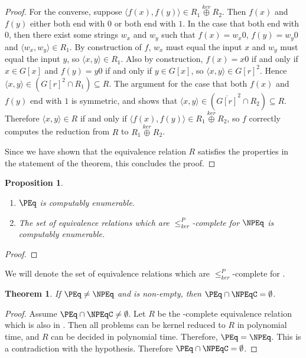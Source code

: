 \documentclass{article}
\newtheorem{theorem}{Theorem}[section]
\newtheorem{proposition}[proposition]{Proposition}
\theoremstyle{definition} \newtheorem{definition}[definition]{Definition}
\newcommand{\kj}{\overset{ker}{\oplus}} %
\newcommand{\kr}{\leq^{P}_{ker}} %
\newcommand{\pair}[2]{\langle#1,#2\rangle} %
\begin{document}
\begin{proof}
  For the converse, suppose $\pair{f(x)}{f(y)}\in R_1\kj R_2$. Then $f(x)$ and
  $f(y)$ either both end with $0$ or both end with $1$. In the case that both
  end with $0$, then there exist some strings $w_x$ and $w_y$ such that
  $f(x)=w_x0$, $f(y)=w_y0$ and $\pair{w_x}{w_y}\in R_1$. By construction of
  $f$, $w_x$ must equal the input $x$ and $w_y$ must equal the input $y$, so
  $\pair{x}{y}\in R_1$. Also by construction, $f(x)=x0$ if and only if $x\in
  G[x]$ and $f(y)=y0$ if and only if $y\in G[x]$, so
  $\pair{x}{y}\in{G[r]}^2$. Hence $\pair{x}{y}\in({G[r]}^2\cap R_1)\subseteq
  R$. The argument for the case that both $f(x)$ and $f(y)$ end with $1$ is
  symmetric, and shows that $\pair{x}{y}\in(\overline{G[r]}^2\cap R_2)\subseteq
  R$. Therefore $\pair{x}{y}\in R$ if and only if $\pair{f(x)}{f(y)}\in R_1\kj
  R_2$, so $f$ correctly computes the reduction from $R$ to $R_1\kj R_2$.

  Since we have shown that the equivalence relation $R$ satisfies the
  properties in the statement of the theorem, this concludes the proof.
\end{proof}

\begin{proposition}
  \mbox{} %
  \begin{enumerate}
  \item $\PEq$ is computably enumerable.
  \item The set of equivalence relations which are $\kr$-complete for $\NPEq$
    is computably enumerable.
  \end{enumerate}
\end{proposition}
\begin{proof}
\end{proof}

We will denote \NPEqC the set of equivalence relations which are $\kr$-complete
for \NPEq.

\begin{theorem}\label{thm:npeqc}
  If $\PEq\neq\NPEq$ and \NPEqC is non-empty, then $\PEq\cap\NPEqC=\emptyset$.
\end{theorem}
\begin{proof}
  Assume $\PEq\cap\NPEqC\neq\emptyset$. Let $R$ be the \NPEq-complete
  equivalence relation which is also in \PEq. Then all problems can be kernel
  reduced to $R$ in polynomial time, and $R$ can be decided in polynomial
  time. Therefore, $\PEq=\NPEq$. This is a contradiction with the
  hypothesis. Therefore $\PEq\cap\NPEqC=\emptyset$.
\end{proof}
\end{document}

